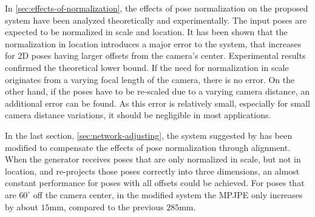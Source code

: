 In \autoref{sec:effects-of-normalization}, the effects of pose normalization on the proposed system have been analyzed theoretically and experimentally.
The input poses are expected to be normalized in scale and location.
It has been shown that the normalization in location introduces a major error to the system, that increases for 2D poses having larger offsets from the camera's center.
Experimental results confirmed the theoretical lower bound.
If the need for normalization in scale originates from a varying focal length of the camera, there is no error.
On the other hand, if the poses have to be re-scaled due to a varying camera distance, an additional error can be found.
As this error is relatively small, especially for small camera distance variations, it should be negligible in most applications.

In the last section, \autoref{sec:network-adjusting}, the system suggested by \citet{drover18} has been modified to compensate the effects of pose normalization through alignment.
When the generator receives poses that are only normalized in scale, but not in location, and re-projects those poses correctly into three dimensions, an almost constant performance for poses with all offsets could be achieved.
For poses that are $60^{\circ}$ off the camera center, in the modified system the MPJPE only increases by about $15$mm, compared to the previous $285$mm.
